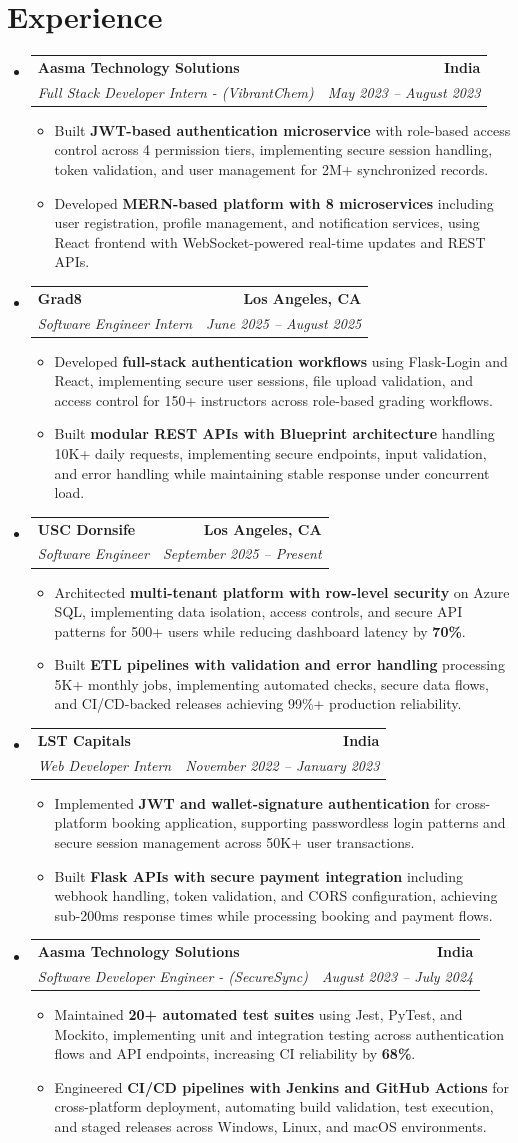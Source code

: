 \documentclass[letterpaper,10pt]{article}
\makeatletter
\newcommand{\resumeItem}[1]{\item\small{{#1 \vspace{-2pt}}}}
\newcommand{\resumeSubheading}[4]{\vspace{-1pt}\item\begin{tabular*}{1.0\textwidth}[t]{l@{\extracolsep{\fill}}r}\textbf{#1} & \textbf{\small #2} \\\textit{\small#3} & \textit{\small #4} \\\end{tabular*}\vspace{-2pt}}
\newcommand{\resumeSubHeadingListStart}{\begin{itemize}[leftmargin=0.0in, label={}]}
\newcommand{\resumeSubHeadingListEnd}{\end{itemize}}
\newcommand{\resumeItemListStart}{\begin{itemize}[leftmargin=0.15in,label=\textbullet,itemsep=2pt,topsep=0pt,parsep=0pt,partopsep=0pt]}
\newcommand{\resumeItemListEnd}{\end{itemize}\vspace{-4pt}}
\makeatother
\begin{document}
\section{Experience}
\resumeSubHeadingListStart
\resumeSubheading{Aasma Technology Solutions}{India}{Full Stack Developer Intern - (VibrantChem)}{May 2023 -- August 2023}
\resumeItemListStart
\resumeItem{Built \textbf{JWT-based authentication microservice} with role-based access control across 4 permission tiers, implementing secure session handling, token validation, and user management for 2M+ synchronized records.}
\resumeItem{Developed \textbf{MERN-based platform with 8 microservices} including user registration, profile management, and notification services, using React frontend with WebSocket-powered real-time updates and REST APIs.}
\resumeItemListEnd
\resumeSubheading{Grad8}{Los Angeles, CA}{Software Engineer Intern}{June 2025 -- August 2025}
\resumeItemListStart
\resumeItem{Developed \textbf{full-stack authentication workflows} using Flask-Login and React, implementing secure user sessions, file upload validation, and access control for 150+ instructors across role-based grading workflows.}
\resumeItem{Built \textbf{modular REST APIs with Blueprint architecture} handling 10K+ daily requests, implementing secure endpoints, input validation, and error handling while maintaining stable response under concurrent load.}
\resumeItemListEnd
\resumeSubheading{USC Dornsife}{Los Angeles, CA}{Software Engineer}{September 2025 -- Present}
\resumeItemListStart
\resumeItem{Architected \textbf{multi-tenant platform with row-level security} on Azure SQL, implementing data isolation, access controls, and secure API patterns for 500+ users while reducing dashboard latency by \textbf{70\%}.}
\resumeItem{Built \textbf{ETL pipelines with validation and error handling} processing 5K+ monthly jobs, implementing automated checks, secure data flows, and CI/CD-backed releases achieving 99\%+ production reliability.}
\resumeItemListEnd
\resumeSubheading{LST Capitals}{India}{Web Developer Intern}{November 2022 -- January 2023}
\resumeItemListStart
\resumeItem{Implemented \textbf{JWT and wallet-signature authentication} for cross-platform booking application, supporting passwordless login patterns and secure session management across 50K+ user transactions.}
\resumeItem{Built \textbf{Flask APIs with secure payment integration} including webhook handling, token validation, and CORS configuration, achieving sub-200ms response times while processing booking and payment flows.}
\resumeItemListEnd
\resumeSubheading{Aasma Technology Solutions}{India}{Software Developer Engineer - (SecureSync)}{August 2023 -- July 2024}
\resumeItemListStart
\resumeItem{Maintained \textbf{20+ automated test suites} using Jest, PyTest, and Mockito, implementing unit and integration testing across authentication flows and API endpoints, increasing CI reliability by \textbf{68\%}.}
\resumeItem{Engineered \textbf{CI/CD pipelines with Jenkins and GitHub Actions} for cross-platform deployment, automating build validation, test execution, and staged releases across Windows, Linux, and macOS environments.}
\resumeItemListEnd
\resumeSubHeadingListEnd
\vspace{-14pt}
\end{document}
